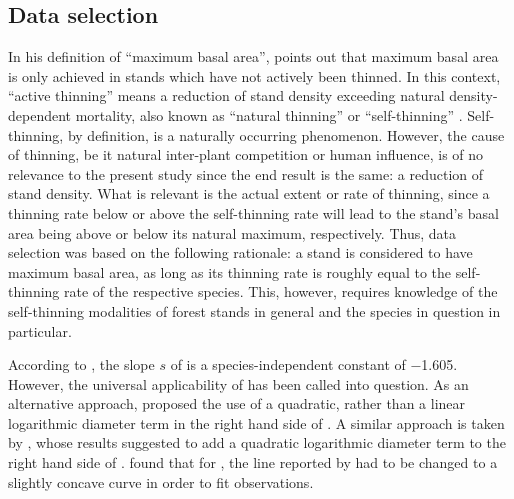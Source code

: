 \subsection{Data selection}

In his definition of ``maximum basal area'', \textcite{Assmann1970} points out that maximum basal area is only achieved in stands which have not actively been thinned.  In this context, ``active thinning'' means a reduction of stand density exceeding natural density-dependent mortality, also known as ``natural thinning'' \parencite{SAF1958} or ``self-thinning'' \parencite{Roehrig1992}.  Self-thinning, by definition, is a naturally occurring phenomenon.  However, the cause of thinning, be it natural inter-plant competition or human influence, is of no relevance to the present study since the end result is the same: a reduction of stand density.  What is relevant is the actual extent or rate of thinning, since a thinning rate below or above the self-thinning rate will lead to the stand’s basal area being above or below its natural maximum, respectively.  Thus, data selection was based on the following rationale:  a stand is considered to have maximum basal area, as long as its thinning rate is roughly equal to the self-thinning rate of the respective species.  This, however, requires knowledge of the self-thinning modalities of forest stands in general and the species in question in particular.

According to \textcite{Reineke1933}, the slope \(s\) of  is a species-independent constant of \num{-1.605}.  However, the universal applicability of  has been called into question.  As an alternative approach, \textcite{Charru2012} proposed the use of a quadratic, rather than a linear logarithmic diameter term in the right hand side of . A similar approach is taken by \textcite{Schuetz2008,Schuetz2010,Zeide1995}, whose results suggested to add a quadratic logarithmic diameter term to the right hand side of .  \textcite{Meyer1938} found that for \Ponderosa{}, the line reported by \textcite{Reineke1933} had to be changed to a slightly concave curve in order to fit observations.  

